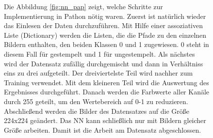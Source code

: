 \documentclass[12pt,toc=bib,toc=listof]{scrreprt}
\begin{document}
\begin{figure}[h]
\begin{minipage}[t]{.71\linewidth}

Die Abbildung \ref{fig:nn_pap} zeigt, welche Schritte zur Implementierung in Pathon nötig waren. Zuerst ist natürlich wieder das Einlesen der Daten durchzuführen. Mit Hilfe einer assoziativen Liste (Dictionary) werden die Listen, die die Pfade zu den einzelnen Bildern enthalten, den beiden Klassen 0 und 1 zugewiesen. 0 steht in diesem Fall für gestempelt und 1 für ungestempelt. Als nächstes wird der Datensatz zufällig durchgemischt und dann in Verhältniss eins zu drei aufgeteilt. Der dreiviertelste Teil wird nachher zum Training verwendet. Mit dem kleineren Teil wird die Auswertung des Ergebnisses durchgeführt. Danach werden die Farbwerte aller Kanäle durch 255 geteilt, um den Wertebereich auf 0-1 zu reduzieren. Abschließend werden die Bilder des Datensatzes auf die Größe 224x224 geändert. Das NN kann schließlich nur mit Bildern gleicher Größe arbeiten. Damit ist die Arbeit am Datensatz abgeschlossen.
\end{minipage}
\hfill
\begin{minipage}[t]{.24\linewidth}
\strut\vspace*{-\baselineskip}
\newline

\end{minipage}
\end{figure}
\end{document}
